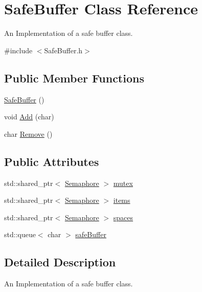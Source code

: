 \hypertarget{class_safe_buffer}{}\section{Safe\+Buffer Class Reference}
\label{class_safe_buffer}


An Implementation of a safe buffer class.  




{\ttfamily \#include $<$Safe\+Buffer.\+h$>$}

\subsection*{Public Member Functions}
\begin{DoxyCompactItemize}
\item 
\hyperlink{class_safe_buffer_af835d8d08c4dcd3326f21ae2e9988699}{Safe\+Buffer} ()
\item 
void \hyperlink{class_safe_buffer_a11cc1330c953304b540355fad3ba0b0e}{Add} (char)
\item 
char \hyperlink{class_safe_buffer_a7a8dc1f39f036cad435bb388d2693c66}{Remove} ()
\end{DoxyCompactItemize}
\subsection*{Public Attributes}
\begin{DoxyCompactItemize}
\item 
std\+::shared\+\_\+ptr$<$ \hyperlink{class_semaphore}{Semaphore} $>$ \hyperlink{class_safe_buffer_a7f90950b182359904348ff978ebb96c6}{mutex}
\item 
std\+::shared\+\_\+ptr$<$ \hyperlink{class_semaphore}{Semaphore} $>$ \hyperlink{class_safe_buffer_aab374b9839a583473e1ec8938715a8e7}{items}
\item 
std\+::shared\+\_\+ptr$<$ \hyperlink{class_semaphore}{Semaphore} $>$ \hyperlink{class_safe_buffer_aa8de2bc2e0f6672f448ef0095faacf8c}{spaces}
\item 
std\+::queue$<$ char $>$ \hyperlink{class_safe_buffer_a8db738cc1b4be3eeba47f322008a2c3e}{safe\+Buffer}
\end{DoxyCompactItemize}


\subsection{Detailed Description}
An Implementation of a safe buffer class. 

